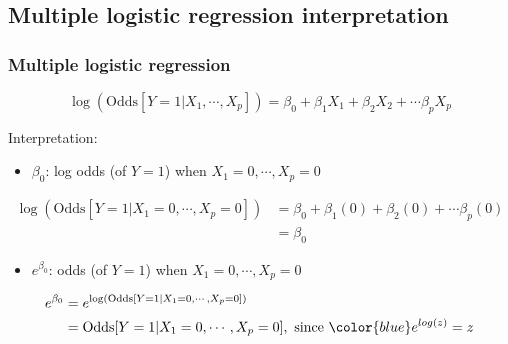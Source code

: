 \documentclass[12pt, 
hyperref={colorlinks=true, linkcolor=blue, urlcolor=cyan}]{beamer}
\begin{document}
\subsection{Multiple logistic regression interpretation}
\begin{frame}
\frametitle{Multiple logistic regression}
$$\log\left(\text{Odds}[Y =1 |X_1,\cdots,X_p]\right) = \beta_0 + \beta_1 X_1 + \beta_2X_2 + \cdots \beta_p X_p$$

\color{blue} Interpretation: \color{black}
\begin{itemize}  \color{orange}
\item $\beta_0$: \pause log odds (of $Y=1$) when $X_1 = 0, \cdots, X_p = 0$ \pause
\end{itemize}
\vspace{-0.3cm}
\begin{footnotesize}
\begin{align*}
\log\left(\text{Odds}[Y =1 |X_1=0,\cdots,X_p=0]\right) & = \beta_0 + \beta_1 (0) + \beta_2(0) + \cdots \beta_p (0) \\
& = \beta_0 
\end{align*} \pause
\end{footnotesize}

\vspace{-0.6cm}
\begin{itemize}   \color{orange}
\item $e^{\beta_0}$: \pause odds (of $Y=1$) when $X_1 = 0, \cdots, X_p = 0$ \pause
\end{itemize}
\vspace{-0.3cm}
\begin{footnotesize}
\begin{align*}
e^{\beta_0} & = e^{\log\left(\text{Odds}[Y =1 |X_1=0,\cdots,X_p=0]\right)} \\
& = \text{Odds}[Y =1 |X_1=0,\cdots,X_p=0], \text{ since } \color{blue} e^{log(z)} = z
\end{align*}
\end{footnotesize}

\end{frame}
\end{document}
